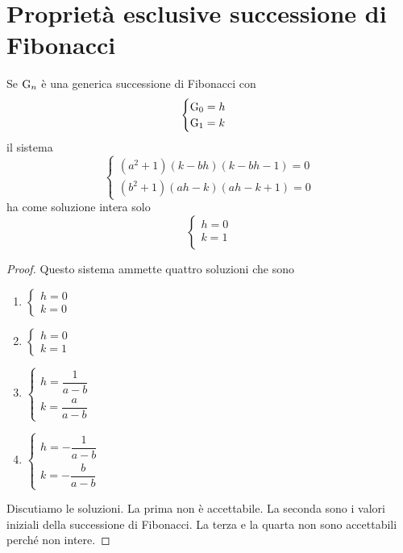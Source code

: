 \section{Proprietà esclusive successione di Fibonacci}
\begin{thm}\label{thm:FibSistCaratteristico}
Se $\mathrm{G}_{n}$ è una generica successione di Fibonacci con
\[\begin{cases}
\mathrm{G}_{0}=h\\
\mathrm{G}_{1}=k\\
\end{cases}\] il sistema 
\begin{equation*}
	\left\{
\begin{array}{l}
	(a^2+1)(k-bh)(k-bh-1)=0\\
	(b^2+1)(ah-k)(ah-k+1)=0
\end{array}
\right.
\end{equation*}
ha come soluzione intera solo \[\begin{cases}
	h=0\\
	k=1\\
\end{cases}\]
\end{thm}
\begin{proof}
Questo sistema ammette quattro soluzioni che sono
\begin{enumerate}
	\item $\left\{
	\begin{array}{l}
		h=0\\
		k=0
	\end{array}
	\right.$
	\item $\left\{
	\begin{array}{l}
		h=0\\
		k=1
	\end{array}
	\right.$
	\item $\left\{
	\begin{array}{l}
		h=\dfrac{1}{a-b}\\
		k=\dfrac{a}{a-b}
	\end{array}
	\right.$
	\item $\left\{
	\begin{array}{l}
		h=-\dfrac{1}{a-b}\\
		k=-\dfrac{b}{a-b}
	\end{array}
	\right.$
\end{enumerate}
Discutiamo le soluzioni. La prima non è accettabile. La seconda sono i valori iniziali della successione di Fibonacci.
La terza e la quarta non sono accettabili perché non intere. 
\end{proof}

